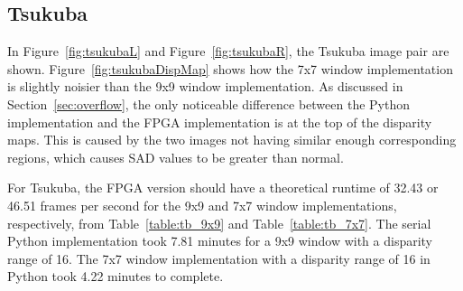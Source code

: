 \subsection{Tsukuba}
\label{sec:tsukuba}

In Figure~\ref{fig:tsukubaL} and Figure~\ref{fig:tsukubaR}, the Tsukuba image pair are shown. Figure~\ref{fig:tsukubaDispMap} shows how the 7x7 window implementation is slightly noisier than the 9x9 window implementation. As discussed in Section~\ref{sec:overflow}, the only noticeable difference between the Python implementation and the FPGA implementation is at the top of the disparity maps. This is caused by the two images not having similar enough corresponding regions, which causes SAD values to be greater than normal. 

For Tsukuba, the FPGA version should have a theoretical runtime of 32.43 or 46.51 frames per second for the 9x9 and 7x7 window implementations, respectively, from Table~\ref{table:tb_9x9} and Table~\ref{table:tb_7x7}. The serial Python implementation took 7.81 minutes for a 9x9 window with a disparity range of 16. The 7x7 window implementation with a disparity range of 16 in Python took 4.22 minutes to complete.

